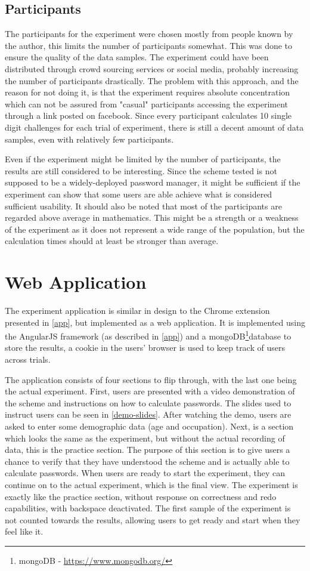\subsection{Participants}
The participants for the experiment were chosen mostly from people known by the author, this limits the number of participants somewhat. This was done to ensure the quality of the data samples. The experiment could have been distributed through crowd sourcing services or social media, probably increasing the number of participants drastically. The problem with this approach, and the reason for not doing it, is that the experiment requires absolute concentration which can not be assured from "casual" participants accessing the experiment through a link posted on facebook. Since every participant calculates 10 single digit challenges for each trial of experiment, there is still a decent amount of data samples, even with relatively few participants. 
\par Even if the experiment might be limited by the number of participants, the results are still considered to be interesting. Since the scheme tested is not supposed to be a widely-deployed password manager, it might be sufficient if the experiment can show that some users are able achieve what is considered sufficient usability. It should also be noted that most of the participants are regarded above average in mathematics. This might be a strength or a weakness of the experiment as it does not represent a wide range of the population, but the calculation times should at least be stronger than average.


\section{Web Application}
The experiment application is similar in design to the Chrome extension presented in \autoref{app}, but implemented as a web application. It is implemented using the AngularJS framework (as described in \autoref{app}) and a mongoDB\footnote{mongoDB - \url{https://www.mongodb.org/}}database to store the results, a cookie in the users' browser is used to keep track of users across trials. 

\par The application consists of four sections to flip through, with the last one being the actual experiment. First, users are presented with a video demonstration of the scheme and instructions on how to calculate passwords. The slides used to instruct users can be seen in \autoref{demo-slides}. After watching the demo, users are asked to enter some demographic data (age and occupation). Next, is a section which looks the same as the experiment, but without the actual recording of data, this is the practice section. The purpose of this section is to give users a chance to verify that they have understood the scheme and is actually able to calculate passwords. When users are ready to start the experiment, they can continue on to the actual experiment, which is the final view. The experiment is exactly like the practice section, without response on correctness and redo capabilities, with backspace deactivated. The first sample of the experiment is not counted towards the results, allowing users to get ready and start when they feel like it. 


